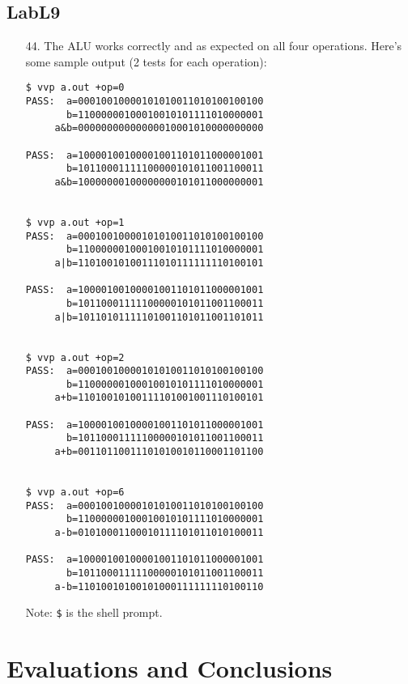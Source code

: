 \documentclass{article}
\begin{document}
\subsection{LabL9}
\begin{enumerate}
\item[44. ] The ALU works correctly and as expected on all four operations. Here's some sample output (2 tests for each operation):
\begin{verbatim}
$ vvp a.out +op=0
PASS:  a=00010010000101010011010100100100
       b=11000000100010010101111010000001
     a&b=00000000000000010001010000000000

PASS:  a=10000100100001001101011000001001
       b=10110001111100000101011001100011
     a&b=10000000100000000101011000000001


$ vvp a.out +op=1
PASS:  a=00010010000101010011010100100100
       b=11000000100010010101111010000001
     a|b=11010010100111010111111110100101

PASS:  a=10000100100001001101011000001001
       b=10110001111100000101011001100011
     a|b=10110101111101001101011001101011


$ vvp a.out +op=2
PASS:  a=00010010000101010011010100100100
       b=11000000100010010101111010000001
     a+b=11010010100111101001001110100101

PASS:  a=10000100100001001101011000001001
       b=10110001111100000101011001100011
     a+b=00110110011101010010110001101100


$ vvp a.out +op=6
PASS:  a=00010010000101010011010100100100
       b=11000000100010010101111010000001
     a-b=01010001100010111101011010100011

PASS:  a=10000100100001001101011000001001
       b=10110001111100000101011001100011
     a-b=11010010100101000111111110100110
\end{verbatim}
  Note: \verb#$# is the shell prompt.
\end{enumerate}


\section{Evaluations and Conclusions}


\end{document}
